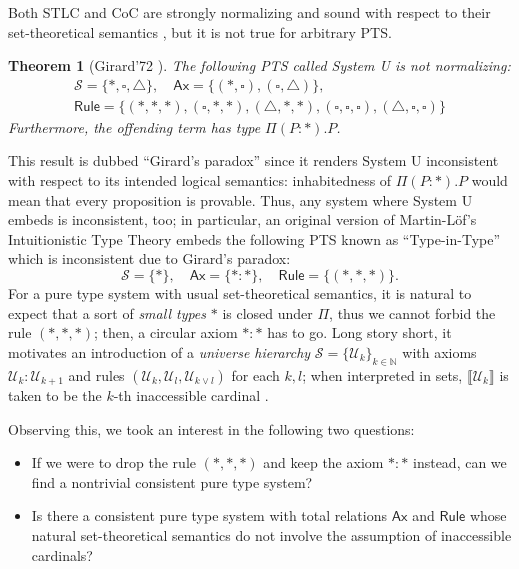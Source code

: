 \documentclass{article}
\newtheorem*{theorem*}{Theorem}
\theoremstyle{definition}
\theoremstyle{remark}
\begin{document}
Both STLC and CoC are strongly normalizing and sound
with respect to their set-theoretical semantics
\cite{tait1967intensional,coquand1990kripke,
geuvers1991modular}, but it is not true for arbitrary
PTS.

\begin{theorem*}[Girard'72
    \cite{girard1972interpretation,
    hurkens1995simplification}]
    The following PTS called System U is not
    normalizing:
    \[\begin{array}{c}
        \mathcal{S}=\{*,\square,\triangle\},
        \quad\mathsf{Ax}=\{
            (*,\square),(\square,\triangle)
        \},
        \\ \mathsf{Rule}=\{
            (*,*,*),(\square,*,*),(\triangle,*,*),
            (\square,\square,\square),
            (\triangle,\square,\square)
        \}
    \end{array}\]
    Furthermore, the offending term has type
    $\Pi(P:*).P$.
\end{theorem*}

This result is dubbed ``Girard's paradox'' since it
renders System U inconsistent with respect to its
intended logical semantics: inhabitedness of
$\Pi(P:*).P$ would mean that every proposition is
provable. Thus, any system where System U embeds is
inconsistent, too; in particular, an original version
\cite{martinlof1971theory} of Martin-L\"{o}f's
Intuitionistic Type Theory
\cite{martinlof1984intuitionistic} embeds the following
PTS known as ``Type-in-Type'' which is inconsistent due
to Girard's paradox:
\[\mathcal{S}=\{*\},\quad\mathsf{Ax}=\{*:*\},\quad
\mathsf{Rule}=\{(*,*,*)\}.\]
For a pure type system with usual set-theoretical
semantics, it is natural to expect that a sort of
\textit{small types} $*$ is closed under $\Pi$, thus we
cannot forbid the rule $(*,*,*)$; then, a circular
axiom $*:*$ has to go. Long story short, it motivates
an introduction of a \textit{universe hierarchy} \cite{
martinlof1975intuitionistic,harper1991universes}
$\mathcal{S}=\{\mathcal{U}_k\}_{k\in\mathbb{N}}$ with
axioms $\mathcal{U}_k:\mathcal{U}_{k+1}$ and rules
$(\mathcal{U}_k,\mathcal{U}_l,\mathcal{U}_{k\vee l})$
for each $k,l$; when interpreted in sets,
$\llbracket \mathcal{U}_k \rrbracket$ is taken to be
the $k$-th inaccessible cardinal \cite{werner1997sets,
aczel1998relating}.

Observing this, we took an interest in the following
two questions:

\begin{itemize}
\item If we were to drop the rule $(*,*,*)$ and keep
    the axiom $*:*$ instead, can we find a nontrivial
    consistent pure type system?
\item Is there a consistent pure type system with total
    relations $\mathsf{Ax}$ and $\mathsf{Rule}$ whose
    natural set-theoretical semantics do not involve
    the assumption of inaccessible cardinals?
\end{itemize}
\end{document}
